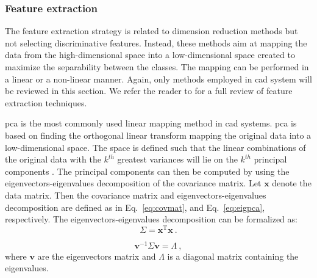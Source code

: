 \subsubsection{Feature extraction}\label{subsubsec:chp3:img-clas:CADX:fea-ext:ext}
The feature extraction strategy is related to dimension reduction methods but not selecting discriminative features.
Instead, these methods aim at mapping the data from the high-dimensional space into a low-dimensional space created to maximize the separability between the classes.
The mapping can be performed in a linear or a non-linear manner.
Again, only methods employed in \ac{cad} system will be reviewed in this section.
We refer the reader to \cite{Fodor2002} for a full review of feature extraction techniques.

\ac{pca} is the most commonly used linear mapping method in \ac{cad} systems.
\ac{pca} is based on finding the orthogonal linear transform mapping the original data into a low-dimensional space.
The space is defined such that the linear combinations of the original data with the $k^{th}$ greatest variances will lie on the $k^{th}$ principal components \cite{Jolliffe2002}.
The principal components can then be computed by using the eigenvectors-eigenvalues decomposition of the covariance matrix.
Let $\mathbf{x}$ denote the data matrix.
Then the covariance matrix and eigenvectors-eigenvalues decomposition are defined as in Eq.~\eqref{eq:covmat}, and Eq.~\eqref{eq:eigpca}, respectively. 
The eigenvectors-eigenvalues decomposition can be formalized as:
\begin{equation}
	\Sigma = \mathbf{x}^{\text{T}} \mathbf{x} \ .
	\label{eq:covmat}
\end{equation}

\begin{equation}
	\mathbf{v}^{-1} \Sigma \mathbf{v} = \Lambda \ ,
	\label{eq:eigpca}
\end{equation}
\noindent where $\mathbf{v}$ are the eigenvectors matrix and $\Lambda$ is a diagonal matrix containing the eigenvalues. 

